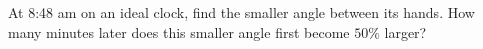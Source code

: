 At 8:48 am on an ideal clock, find the smaller angle between its hands. How many minutes later does this smaller angle first become $50\%$ larger?
